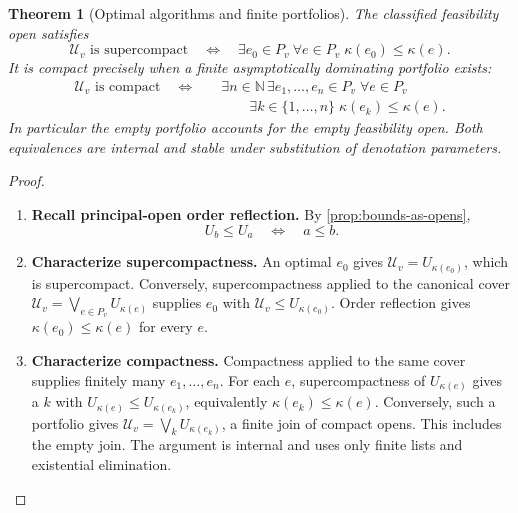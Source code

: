 \documentclass[11pt,a4paper]{article}
\numberwithin{algorithm}{section}
\numberwithin{equation}{section}
\newtheorem{theorem}{Theorem}[section]
\theoremstyle{definition}
\theoremstyle{remark}
\theoremstyle{plain}
\newcommand{\N}{\mathbb N}
\theoremstyle{definition}
\theoremstyle{plain}
\begin{document}
\begin{theorem}[Optimal algorithms and finite portfolios]
\label{thm:optimization-compactness}
The classified feasibility open satisfies
\begin{equation}\label{eq:supercompact-optimal}
 \mathcal U_v\text{ is supercompact}
 \quad\Longleftrightarrow\quad
 \exists e_0\in P_v\ \forall e\in P_v\;
       \kappa(e_0)\le\kappa(e).
\end{equation}
It is compact precisely when a finite asymptotically dominating
portfolio exists:
\begin{equation}\label{eq:compact-portfolio}
 \begin{aligned}
 \mathcal U_v\text{ is compact}\quad\Longleftrightarrow\quad
 &\exists n\in\N\,\exists e_1,\ldots,e_n\in P_v\;\forall e\in P_v\\
 &\qquad\exists k\in\{1,\ldots,n\}\;
                 \kappa(e_k)\le\kappa(e).
 \end{aligned}
\end{equation}
In particular the empty portfolio accounts for the empty
feasibility open.  Both equivalences are internal and stable under
substitution of denotation parameters.
\end{theorem}
\begin{proof}\leavevmode
\begin{enumerate}[leftmargin=*,align=left]
\item \textbf{Recall principal-open order reflection.}
By \cref{prop:bounds-as-opens},
\begin{equation}\label{eq:principal-open-reflection}
 U_b\le U_a\quad\Longleftrightarrow\quad a\le b.
\end{equation}

\item \textbf{Characterize supercompactness.}
An optimal $e_0$ gives $\mathcal U_v=U_{\kappa(e_0)}$, which is
supercompact. Conversely, supercompactness applied to the canonical
cover $\mathcal U_v=\bigvee_{e\in P_v}U_{\kappa(e)}$ supplies
$e_0$ with $\mathcal U_v\le U_{\kappa(e_0)}$.
Order reflection gives $\kappa(e_0)\le\kappa(e)$ for every $e$.

\item \textbf{Characterize compactness.}
Compactness applied to the same cover supplies finitely many
$e_1,\ldots,e_n$. For each $e$, supercompactness of
$U_{\kappa(e)}$ gives a $k$ with
$U_{\kappa(e)}\le U_{\kappa(e_k)}$, equivalently
$\kappa(e_k)\le\kappa(e)$.
Conversely, such a portfolio gives
$\mathcal U_v=\bigvee_k U_{\kappa(e_k)}$, a finite join of compact
opens. This includes the empty join. The argument is internal and
uses only finite lists and existential elimination.
\end{enumerate}
\end{proof}
\end{document}
